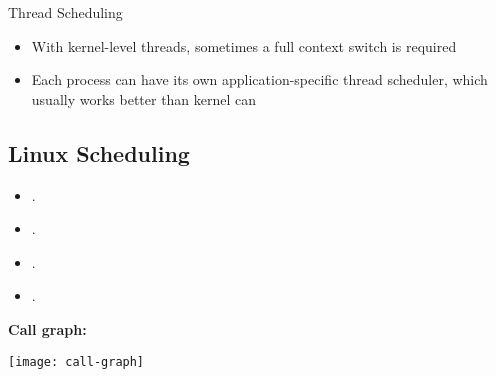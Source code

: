 \begin{frame}{Thread Scheduling}
  \begin{center}
  \end{center}
  \begin{itemize}
  \item With kernel-level threads, sometimes a full context switch is required
  \item Each process can have its own application-specific thread scheduler, which usually works
    better than kernel can
  \end{itemize}
\end{frame}

\subsection{Linux Scheduling}

\begin{itemize}
\item {}.
\item {}.
\item {}.
\item {}.
\end{itemize}

\textbf{Call graph:}
\begin{center}
  \texttt{[image: call-graph]}
\end{center}

